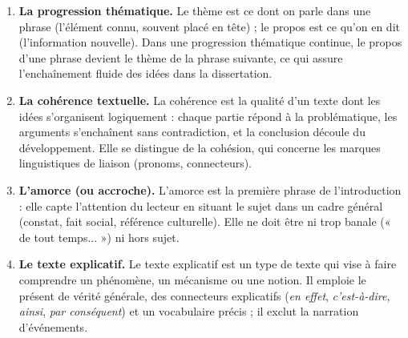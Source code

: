 \documentclass[11pt]{article}
\newcommand{\cle}[1]{{\popxbold\color{popdark}#1}}
\begin{document}
\begin{corrige}
\begin{enumerate}
\item \textbf{La progression thématique.} Le \cle{thème} est ce dont on parle dans une phrase (l'élément connu, souvent placé en tête) ; le \cle{propos} est ce qu'on en dit (l'information nouvelle). Dans une progression thématique continue, le propos d'une phrase devient le thème de la phrase suivante, ce qui assure l'enchaînement fluide des idées dans la dissertation.
\item \textbf{La cohérence textuelle.} La cohérence est la qualité d'un texte dont les idées s'organisent logiquement : chaque partie répond à la problématique, les arguments s'enchaînent sans contradiction, et la conclusion découle du développement. Elle se distingue de la cohésion, qui concerne les marques linguistiques de liaison (pronoms, connecteurs).
\item \textbf{L'amorce (ou accroche).} L'amorce est la première phrase de l'introduction : elle capte l'attention du lecteur en situant le sujet dans un cadre général (constat, fait social, référence culturelle). Elle ne doit être ni trop banale (« de tout temps... ») ni hors sujet.
\item \textbf{Le texte explicatif.} Le texte explicatif est un type de texte qui vise à faire comprendre un phénomène, un mécanisme ou une notion. Il emploie le présent de vérité générale, des connecteurs explicatifs (\emph{en effet}, \emph{c'est-à-dire}, \emph{ainsi}, \emph{par conséquent}) et un vocabulaire précis ; il exclut la narration d'événements.
\end{enumerate}
\end{corrige}
\end{document}
